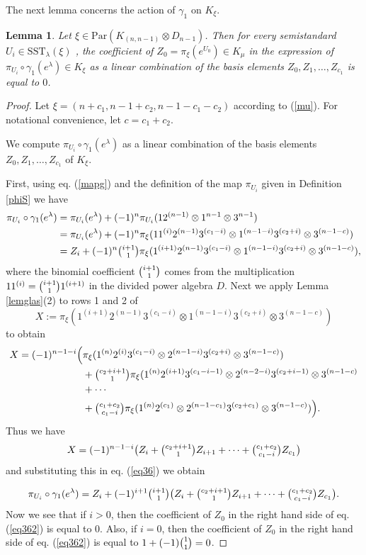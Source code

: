 \documentclass[11pt]{amsart}
\newtheorem{lem}[thm]{Lemma}
\theoremstyle{definition}
\numberwithin{equation}{section}
\begin{document}
The next lemma concerns the action of $\gamma_1$ on $K_\xi$.

\begin{lem}\label{lemma3}Let $\xi \in \mathrm{Par}(K_{(n,n-1)} \otimes  D_{n-1})$. Then for every semistandard $U_i \in \mathrm{SST}_{\lambda}(\xi)$ , the coefficient of $Z_0=\pi_\xi(e^{U_0}) \in K_\mu$ in the expression of  $\pi_{U_i} \circ \gamma_1 (e^\lambda) \in K_\xi$ as a linear combination of the basis elements $Z_0, Z_1, \dots, Z_{c_1}$ is equal to $0$.
\end{lem}
\begin{proof} Let $\xi=(n + c_1, n-1 + c_2, n-1-c_1-c_2)$ according to (\ref{mu}). For notational convenience, let $c=c_1+c_2$. 
	
We compute $\pi_{U_i} \circ \gamma_1 (e^\lambda)$ as a linear combination of the basis elements $Z_0, Z_1, \dots, Z_{c_1}$ of $K_\xi$.

First, using eq. (\ref{mapg}) and the definition of the map $\pi_{U_i}$ given in Definition \ref{phiS} we have 
\begin{align}\label{eq36}\pi_{U_i} \circ \gamma_1 (e^\lambda)&=\pi_{U_i}(e^{\lambda})+(-1)^n\pi_{U_i}(12^{(n-1)}\otimes1^{n-1}\otimes3^{n-1})\\\nonumber&=\pi_{U_i}(e^{\lambda})+ (-1)^n\pi_{\xi}(11^{(i)}2^{(n-1)}3^{(c_1-i)} \otimes 1^{(n-1-i)}3^{(c_2+i)} \otimes 3^{(n-1-c)})\\\nonumber&=Z_i+(-1)^n\tbinom{i+1}{1}\pi_{\xi}(1^{(i+1)}2^{(n-1)}3^{(c_1-i)} \otimes 1^{(n-1-i)}3^{(c_2+i)} \otimes 3^{(n-1-c)}),\end{align} where the binomial coefficient $\tbinom{i+1}{1}$ comes from the multiplication $11^{(i)}=\tbinom{i+1}{1}1^{(i+1)}$ in the divided power algebra $D$.
Next we apply Lemma \ref{lemglas}(2) to rows 1 and 2 of \[X:=\pi_{\xi}(1^{(i+1)}2^{(n-1)}3^{(c_1-i)} \otimes 1^{(n-1-i)}3^{(c_2+i)} \otimes 3^{(n-1-c)})\] to obtain 
	\begin{align*}X=(-1)^{n-1-i}\Big(&\pi_\xi(1^{(n)}2^{(i)}3^{(c_1-i)}\otimes 2^{(n-1-i)}3^{(c_2+i)}\otimes 3^{(n-1-c)} ) \\&+\tbinom{c_2+i+1}{1}\pi_\xi(1^{(n)}2^{(i+1)}3^{(c_1-i-1)}\otimes 2^{(n-2-i)}3^{(c_2+i-1)}\otimes 3^{(n-1-c)} \\&+ \cdots \\&+ \tbinom{c_1+c_2}{c_1-i}\pi_\xi(1^{(n)}2^{(c_1)}\otimes 2^{(n-1-c_1)}3^{(c_2+c_1)}\otimes 3^{(n-1-c)} ) \Big).\end{align*}
Thus we have \[X=(-1)^{n-1-i}\big( Z_i +\tbinom{c_2+i+1}{1}Z_{i+1} + \cdots + \tbinom{c_1+c_2}{c_1-i} Z_{c_1}\big)\]	and substituting this in eq. (\ref{eq36}) we obtain 
	
	\begin{equation}\label{eq362}\pi_{U_i} \circ \gamma_1 (e^\lambda)=Z_i+(-1)^{i+1}\tbinom{i+1}{1}\big( Z_i +\tbinom{c_2+i+1}{1}Z_{i+1} + \cdots + \tbinom{c_1+c_2}{c_1-i}Z_{c_1} \big).\end{equation}
	Now we see that if $i>0$, then the coefficient of $Z_0$ in the right hand side of eq. (\ref{eq362}) is equal to 0. Also, if $i=0$, then the coefficient of $Z_0$ in the right hand side of eq. (\ref{eq362}) is equal to $1+(-1)\tbinom{1}{1}=0$.
\end{proof}
\end{document}
